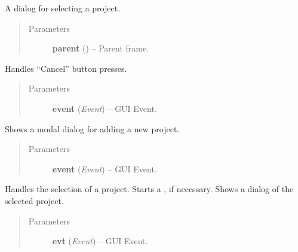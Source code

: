 \documentclass[letterpaper,10pt,english]{sphinxmanual}
\begin{document}

\begin{fulllineitems}
\label{dialogs:dialogs.ProjectSelectDialog}
A dialog for selecting a project.
\begin{quote}\begin{description}
\item[{Parameters}] \leavevmode
\textbf{parent} () -- Parent frame.

\end{description}\end{quote}

\begin{fulllineitems}
\label{dialogs:dialogs.ProjectSelectDialog.OnCancel}
Handles ``Cancel'' button presses.
\begin{quote}\begin{description}
\item[{Parameters}] \leavevmode
\textbf{event} (\emph{Event}) -- GUI Event.

\end{description}\end{quote}

\end{fulllineitems}


\begin{fulllineitems}
\label{dialogs:dialogs.ProjectSelectDialog.OnProjectAdd}
Shows a modal dialog for adding a new project.
\begin{quote}\begin{description}
\item[{Parameters}] \leavevmode
\textbf{event} (\emph{Event}) -- GUI Event.

\end{description}\end{quote}

\end{fulllineitems}


\begin{fulllineitems}
\label{dialogs:dialogs.ProjectSelectDialog.OnProjectDelete}
Handles the selection of a project.
Starts a , if necessary.
Shows a dialog of the selected project.
\begin{quote}\begin{description}
\item[{Parameters}] \leavevmode
\textbf{evt} (\emph{Event}) -- GUI Event.


\end{description}
\end{quote}
\end{fulllineitems}
\end{fulllineitems}
\end{document}
